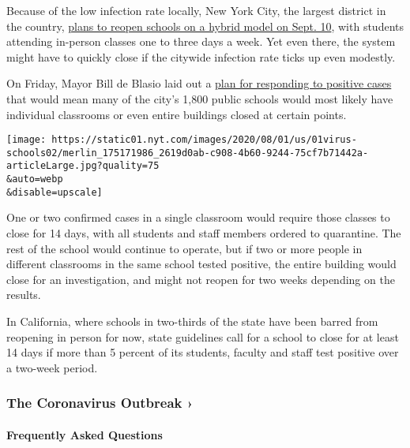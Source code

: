 Because of the low infection rate locally, New York City, the largest
district in the country,
\href{https://www.nytimes.com/2020/07/08/nyregion/nyc-schools-reopening-plan.html}{plans
to reopen schools on a hybrid model on Sept. 10}, with students
attending in-person classes one to three days a week. Yet even there,
the system might have to quickly close if the citywide infection rate
ticks up even modestly.

On Friday, Mayor Bill de Blasio laid out a
\href{https://www.nytimes.com/2020/07/30/world/coronavirus-covid-19.html\#link-177c5cda}{plan
for responding to positive cases} that would mean many of the city's
1,800 public schools would most likely have individual classrooms or
even entire buildings closed at certain points.

\texttt{[image: https://static01.nyt.com/images/2020/08/01/us/01virus-schools02/merlin\_175171986\_2619d0ab-c908-4b60-9244-75cf7b71442a-articleLarge.jpg?quality=75\\\&auto=webp\\\&disable=upscale]}

One or two confirmed cases in a single classroom would require those
classes to close for 14 days, with all students and staff members
ordered to quarantine. The rest of the school would continue to operate,
but if two or more people in different classrooms in the same school
tested positive, the entire building would close for an investigation,
and might not reopen for two weeks depending on the results.

In California, where schools in two-thirds of the state have been barred
from reopening in person for now, state guidelines call for a school to
close for at least 14 days if more than 5 percent of its students,
faculty and staff test positive over a two-week period.

\href{https://www.nytimes.com/news-event/coronavirus?action=click\&pgtype=Article\&state=default\&region=MAIN_CONTENT_3\&context=storylines_faq}{}

\hypertarget{the-coronavirus-outbreak-}{%
\subsubsection{The Coronavirus Outbreak
›}\label{the-coronavirus-outbreak-}}

\hypertarget{frequently-asked-questions}{%
\paragraph{Frequently Asked
Questions}\label{frequently-asked-questions}}

